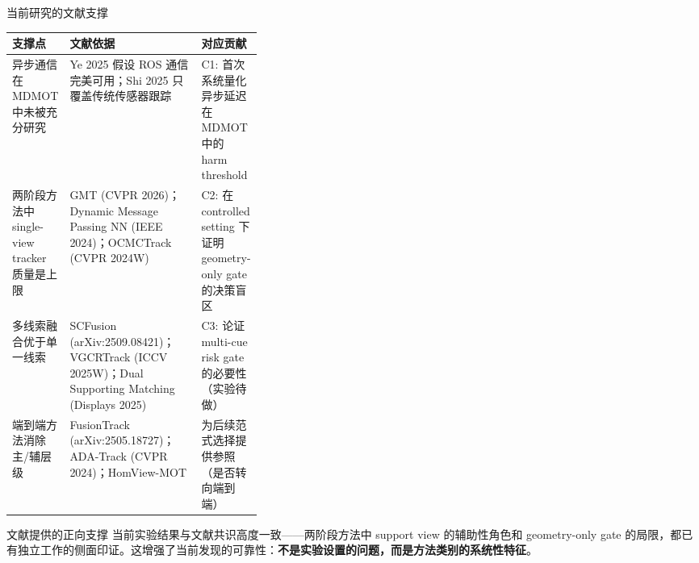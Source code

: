 \documentclass[aspectratio=169,xcolor=dvipsnames]{beamer}
\begin{document}
\begin{frame}{当前研究的文献支撑}
\scriptsize
\begin{tabularx}{\linewidth}{p{0.18\linewidth} X p{0.18\linewidth}}
\toprule
支撑点 & 文献依据 & 对应贡献 \\
\midrule
异步通信在 MDMOT 中未被充分研究 &
Ye 2025 假设 ROS 通信完美可用；Shi 2025 只覆盖传统传感器跟踪 &
C1: 首次系统量化异步延迟在 MDMOT 中的 harm threshold \\
\addlinespace
两阶段方法中 single-view tracker 质量是上限 &
GMT (CVPR 2026)；Dynamic Message Passing NN (IEEE 2024)；OCMCTrack (CVPR 2024W) &
C2: 在 controlled setting 下证明 geometry-only gate 的决策盲区 \\
\addlinespace
多线索融合优于单一线索 &
SCFusion (arXiv:2509.08421)；VGCRTrack (ICCV 2025W)；Dual Supporting Matching (Displays 2025) &
C3: 论证 multi-cue risk gate 的必要性（实验待做） \\
\addlinespace
端到端方法消除主/辅层级 &
FusionTrack (arXiv:2505.18727)；ADA-Track (CVPR 2024)；HomView-MOT &
为后续范式选择提供参照（是否转向端到端） \\
\bottomrule
\end{tabularx}

\vspace{2mm}
\begin{block}{文献提供的正向支撑}
当前实验结果与文献共识高度一致——两阶段方法中 support view 的辅助性角色和 geometry-only gate 的局限，都已有独立工作的侧面印证。这增强了当前发现的可靠性：\textbf{不是实验设置的问题，而是方法类别的系统性特征}。
\end{block}
\end{frame}
\end{document}
